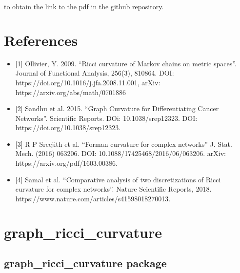 \documentclass[letterpaper,10pt,english]{sphinxmanual}
\begin{document}
\begin{sphinxVerbatim}[commandchars=\\\{\}]
   
\end{sphinxVerbatim}

\sphinxAtStartPar
to obtain the link to the pdf in the github repository.


\chapter{References}
\label{\detokenize{index:references}}\begin{itemize}
\item {} 
\sphinxAtStartPar
{[}1{]} Ollivier, Y. 2009. “Ricci curvature of Markov chains on metric spaces”. Journal of Functional Analysis, 256(3), 810\sphinxhyphen{}864. DOI: https://doi.org/10.1016/j.jfa.2008.11.001, arXiv: https://arxiv.org/abs/math/0701886

\item {} 
\sphinxAtStartPar
{[}2{]} Sandhu et al. 2015. “Graph Curvature for Differentiating Cancer Networks”. Scientific Reports. DOi: 10.1038/srep12323. DOI: https://doi.org/10.1038/srep12323.

\item {} 
\sphinxAtStartPar
{[}3{]} R P Sreejith et al. “Forman curvature for complex networks” J. Stat. Mech. (2016) 063206. DOI: 10.1088/1742\sphinxhyphen{}5468/2016/06/063206. arXiv: https://arxiv.org/pdf/1603.00386.

\item {} 
\sphinxAtStartPar
{[}4{]} Samal et al. “Comparative analysis of two discretizations of Ricci curvature for complex networks”. Nature Scientific Reports, 2018. https://www.nature.com/articles/s41598\sphinxhyphen{}018\sphinxhyphen{}27001\sphinxhyphen{}3.

\end{itemize}

\sphinxstepscope


\chapter{graph\_ricci\_curvature}
\label{\detokenize{modules:graph-ricci-curvature}}\label{\detokenize{modules::doc}}
\sphinxstepscope


\section{graph\_ricci\_curvature package}
\label{\detokenize{graph_ricci_curvature:graph-ricci-curvature-package}}\label{\detokenize{graph_ricci_curvature::doc}}
\end{document}

